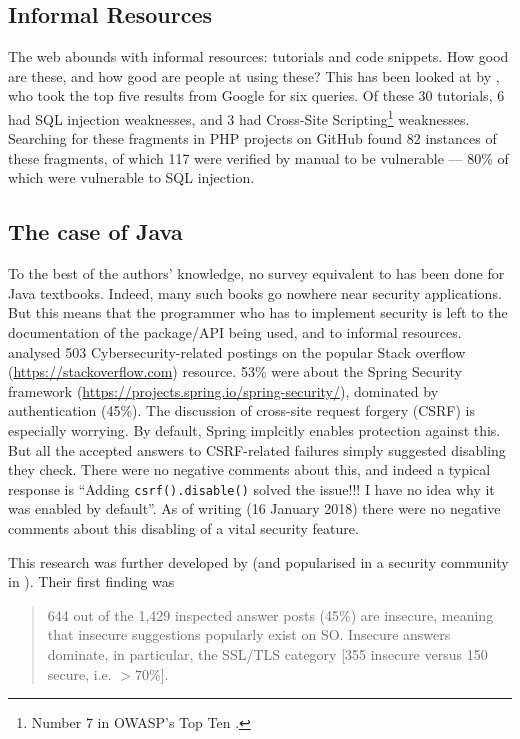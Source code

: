 \documentclass[conference]{IEEEtran}
\begin{document}
\subsection{Informal Resources}\label{sec:informal}
The web abounds with informal resources: tutorials and code snippets. How good are these, and how good are people at using these? This has been looked at by \cite{Unruhetal2017a}, who took the top five results from Google for six queries. Of these 30 tutorials, 6 had SQL injection weaknesses, and 3 had Cross-Site Scripting\footnote{Number 7 in OWASP's Top Ten \cite{OWASP2017a}.} weaknesses. Searching for these fragments in PHP projects on GitHub found 82 instances of these fragments, of which 117 were verified by manual to be vulnerable --- 80\% of which were vulnerable to SQL injection.

\subsection{The case of Java}\label{sec:Java}
To the best of the authors' knowledge, no survey equivalent to \cite{Drop2019} has been done for Java textbooks. Indeed, many such books go nowhere near security applications.  But this means that the programmer who has to implement security is left to the documentation of the package/API being used, and to informal resources. \cite{Mengetal2018a} analysed 503 Cybersecurity-related postings on the popular Stack overflow (\url{https://stackoverflow.com}) resource.  53\% were about the Spring Security framework (\url{https://projects.spring.io/spring-security/}), dominated by authentication (45\%). The discussion \cite[\S4.3.1]{Mengetal2018a} of cross-site request forgery (CSRF) is especially worrying.  By default, Spring implcitly enables protection against this. But all the accepted answers to CSRF-related failures simply suggested disabling they check. There were no negative comments about this, and indeed a typical response is ``Adding \verb!csrf().disable()!
solved the issue!!! I have no idea why it was enabled by default''. As of writing (16 January 2018) there were no negative comments about this disabling of a vital security feature.
\par
This research was further developed by \cite{Chenetal2019a}  (and popularised in a security community in \cite{Zorz2019a}). Their first finding was
\begin{quote}
644 out of the 1,429 inspected answer posts
(45\%) are insecure, meaning that insecure suggestions
popularly exist on SO. Insecure answers dominate, in
particular, the SSL/TLS category [355 insecure versus 150 secure, i.e. $>70$\%].
\end{quote} 
\end{document}
